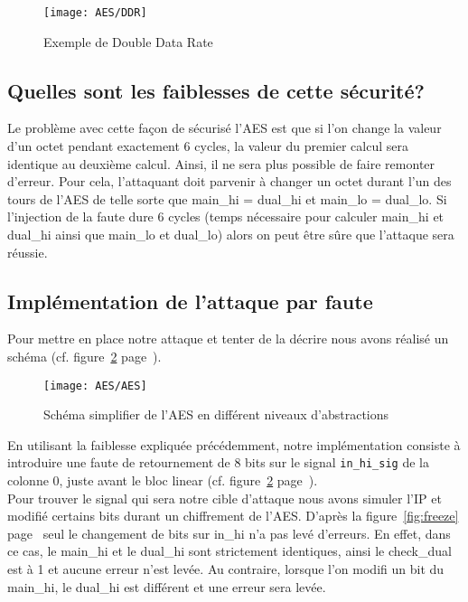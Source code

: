 \begin{figure}[!htbp]
	\begin{center}
		\texttt{[image: AES/DDR]}
		\caption{Exemple de Double Data Rate}
		\label{fig:DDR}
	\end{center}
\end{figure}

\subsection{Quelles sont les faiblesses de cette sécurité?}

Le problème avec cette façon de sécurisé l'AES est que si l'on change la valeur
d'un octet pendant exactement 6 cycles, la valeur du premier calcul sera
identique au deuxième calcul.
Ainsi, il ne sera plus possible de faire remonter d'erreur. 
Pour cela, l'attaquant doit parvenir à changer un octet durant l'un des tours de 
l'AES de telle sorte que main\_hi = dual\_hi et main\_lo = dual\_lo.
Si l'injection de la faute dure 6 cycles (temps nécessaire pour calculer
main\_hi et dual\_hi ainsi que main\_lo et dual\_lo) alors on peut être sûre que 
l'attaque sera réussie.

\subsection{Implémentation de l'attaque par faute}

Pour mettre en place notre attaque et tenter de la décrire nous avons réalisé 
un schéma (cf. figure~\ref{fig:AES} page~\pageref{fig:AES}).

\begin{figure}[!h]
	\begin{center}
		\texttt{[image: AES/AES]}
		\caption{Schéma simplifier de l'AES en différent niveaux d'abstractions}
		\label{fig:AES}
	\end{center}
\end{figure}

En utilisant la faiblesse expliquée précédemment, notre implémentation
consiste à introduire une faute de retournement de 8 bits sur le signal
\texttt{in\_hi\_sig} de la colonne 0, juste avant le bloc linear 
(cf. figure~\ref{fig:AES} page~\pageref{fig:AES}).\\
Pour trouver le signal qui sera notre cible d'attaque nous avons 
simuler l'IP et modifié certains bits durant un chiffrement de l'AES. 
D'après la figure~\ref{fig:freeze} page~\pageref{fig:freeze} seul le changement 
de bits sur in\_hi n'a pas levé d'erreurs. En effet, dans ce cas, le main\_hi et le  dual\_hi 
sont strictement identiques, ainsi le check\_dual est à 1 et aucune erreur n'est levée. 
Au contraire, lorsque l'on modifi un bit du main\_hi, le dual\_hi est différent 
et une erreur sera levée.\\

